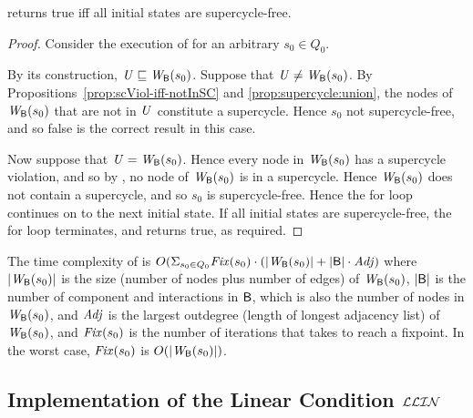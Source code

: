 \begin{proposition}
 returns true iff all initial states are supercycle-free.
\end{proposition}
%
\begin{proof}
Consider the execution of  for an arbitrary $s_0 \in Q_0$.

By its construction, $\mathit{U} \sqsubseteq \mathit{W}_{\mathsf{B}}({s_0})$.
Suppose that $\mathit{U} \ne  \mathit{W}_{\mathsf{B}}({s_0})$.
By Propositions~\ref{prop:scViol-iff-notInSC} and
\ref{prop:supercycle:union}, the nodes of $\mathit{W}_{\mathsf{B}}({s_0})$ that are not in $\mathit{U}$ constitute a supercycle.
Hence $s_0$ not supercycle-free, and so false is the correct result in this case.

Now suppose that $\mathit{U} = \mathit{W}_{\mathsf{B}}({s_0})$. Hence every node in $\mathit{W}_{\mathsf{B}}({s_0})$ has a supercycle violation, and so
by , no node of $\mathit{W}_{\mathsf{B}}({s_0})$ is in a 
supercycle. Hence  $\mathit{W}_{\mathsf{B}}({s_0})$ does not contain a supercycle, and so
$s_0$ is supercycle-free.
Hence the for loop continues on to the next initial state.
If all initial states are supercycle-free, the for loop terminates, and
 returns true, as required.
\end{proof}

The time complexity of  is
$O(\Sigma_{s_0 \in Q_0} \mathit{Fix}(s_0) \cdot (|\mathit{W}_{\mathsf{B}}({s_0})| + |\mathsf{B}| \cdot \mathit{Adj})$
where
$|\mathit{W}_{\mathsf{B}}({s_0})|$ is the size (number of nodes plus number of edges) of $\mathit{W}_{\mathsf{B}}({s_0})$,
$|\mathsf{B}|$ is the number of component and interactions in $\mathsf{B}$, which is also the number of nodes in $\mathit{W}_{\mathsf{B}}({s_0})$,
and
$\mathit{Adj}$ is the largest outdegree (\ie length of longest adjacency list) of $\mathit{W}_{\mathsf{B}}({s_0})$, and 
$\mathit{Fix}(s_0)$ is the  number of iterations that   takes to reach a fixpoint. In the worst case, 
$\mathit{Fix}(s_0)$ is $O(|\mathit{W}_{\mathsf{B}}({s_0})|)$.



   \subsection{Implementation of the Linear Condition $\mathcal{LLIN}$}
   \label{s:implLin}
%   
  


